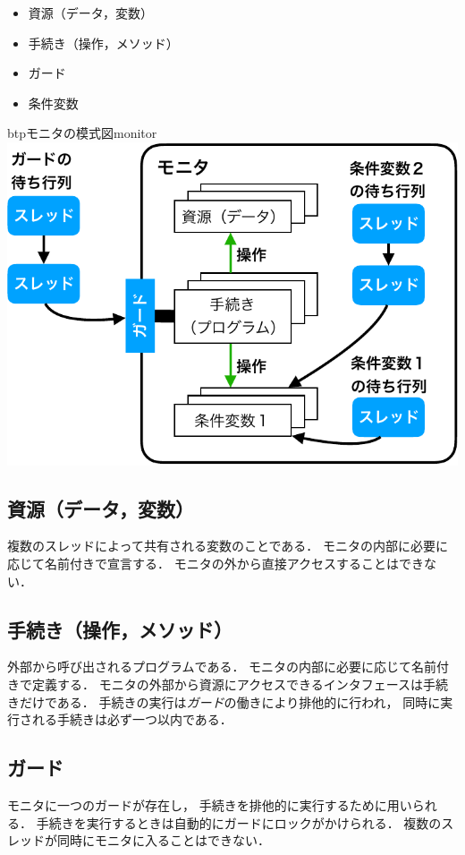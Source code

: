 \begin{itemize}
\item 資源（データ，変数）
\item 手続き（操作，メソッド）
\item ガード
\item 条件変数
\end{itemize}

\begin{myfig}{btp}{モニタの模式図}{monitor}
  \includegraphics[scale=0.6]{Fig/monitor-crop.pdf}
\end{myfig}

\subsection{資源（データ，変数）}
複数のスレッドによって共有される変数のことである．
モニタの内部に必要に応じて名前付きで宣言する．
モニタの外から直接アクセスすることはできない．

\subsection{手続き（操作，メソッド）}
外部から呼び出されるプログラムである．
モニタの内部に必要に応じて名前付きで定義する．
モニタの外部から資源にアクセスできるインタフェースは手続きだけである．
手続きの実行は\emph{ガード}の働きにより排他的に行われ，
同時に実行される手続きは必ず一つ以内である．

\subsection{ガード}
モニタに一つのガードが存在し，
手続きを排他的に実行するために用いられる．
手続きを実行するときは自動的にガードにロックがかけられる．
複数のスレッドが同時にモニタに入ることはできない．

